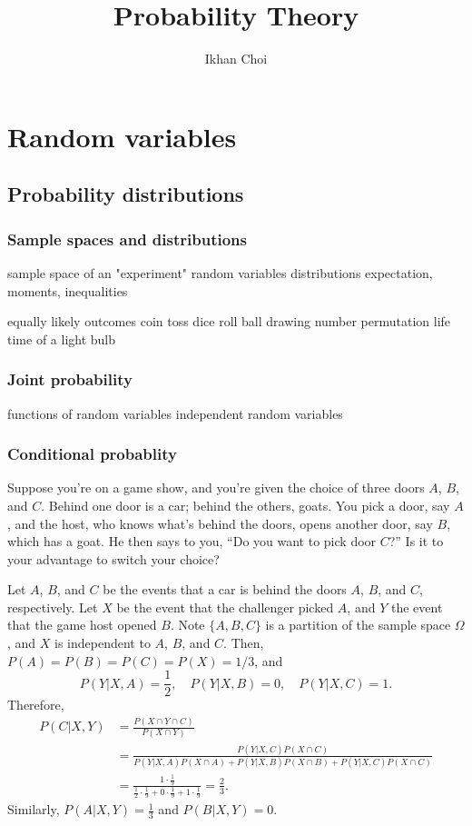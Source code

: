 \documentclass{../note}
\begin{document}
\title{Probability Theory}
\author{Ikhan Choi}
\maketitle
\tableofcontents


\part{Random variables}


\chapter{Probability distributions}

\section{Sample spaces and distributions}


sample space of an "experiment"
random variables
distributions
expectation, moments, inequalities

equally likely outcomes
	coin toss
	dice roll
	ball drawing
	number permutation
	life time of a light bulb


\section{Joint probability}
functions of random variables
independent random variables


\section{Conditional probablity}

\begin{prb}
Suppose you're on a game show, and you're given the choice of three doors $A$, $B$, and $C$.
Behind one door is a car; behind the others, goats.
You pick a door, say $A$, and the host, who knows what's behind the doors, opens another door, say $B$, which has a goat.
He then says to you, ``Do you want to pick door $C$?''
Is it to your advantage to switch your choice?
\end{prb}
\begin{pf}
Let $A$, $B$, and $C$ be the events that a car is behind the doors $A$, $B$, and $C$, respectively.
Let $X$ be the event that the challenger picked $A$, and $Y$ the event that the game host opened $B$.
Note $\{A,B,C\}$ is a partition of the sample space $\Omega$, and $X$ is independent to $A$, $B$, and $C$.
Then, $P(A)=P(B)=P(C)=P(X)=1/3$, and
\[P(Y|X,A)=\frac12,\quad P(Y|X,B)=0,\quad P(Y|X,C)=1.\]
Therefore,
\begin{align*}
P(C|X,Y)&=\frac{P(X\cap Y\cap C)}{P(X\cap Y)}\\
&=\frac{P(Y|X,C)P(X\cap C)}{P(Y|X,A)P(X\cap A)+P(Y|X,B)P(X\cap B)+P(Y|X,C)P(X\cap C)}\\
&=\frac{1\cdot \frac19}{\frac12\cdot\frac19+0\cdot\frac19+1\cdot\frac19}=\frac23.
\end{align*}
Similarly, $P(A|X,Y)=\frac13$ and $P(B|X,Y)=0$.
\end{pf}
\end{document}
